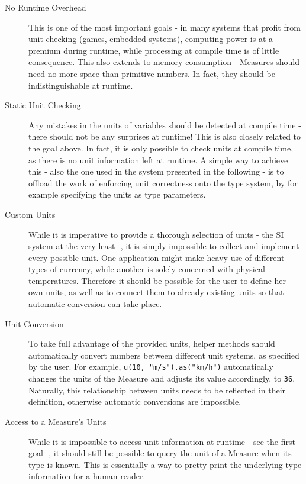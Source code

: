 \documentclass[12pt,oneside,a4paper]{scrbook}
\begin{document}
\begin{description}
  \item[No Runtime Overhead] This is one of the most important goals - in many systems that profit from unit checking (games, embedded systems), computing power is at a premium during runtime, while processing at compile time is of little consequence. This also extends to memory consumption - Measures should need no more space than primitive numbers. In fact, they should be indistinguishable at runtime.

  \item[Static Unit Checking] Any mistakes in the units of variables should be detected at compile time - there should not be any surprises at runtime! This is also closely related to the goal above. In fact, it is only possible to check units at compile time, as there is no unit information left at runtime. A simple way to achieve this - also the one used in the system presented in the following - is to offload the work of enforcing unit correctness onto the type system, by for example specifying the units as type parameters.

  \item[Custom Units] While it is imperative to provide a thorough selection of units - the SI system at the very least -, it is simply impossible to collect and implement every possible unit. One application might make heavy use of different types of currency, while another is solely concerned with physical temperatures. Therefore it should be possible for the user to define her own units, as well as to connect them to already existing units so that automatic conversion can take place.

  \item[Unit Conversion] To take full advantage of the provided units, helper methods should automatically convert numbers between different unit systems, as specified by the user. For example, \verb|u(10, "m/s").as("km/h")| automatically changes the units of the Measure and adjusts its value accordingly, to \verb/36/. Naturally, this relationship between units needs to be reflected in their definition, otherwise automatic conversions are impossible.

  \item[Access to a Measure's Units] While it is impossible to access unit information at runtime - see the first goal -, it should still be possible to query the unit of a Measure when its type is known. This is essentially a way to pretty print the underlying type information for a human reader.


\end{description}
\end{document}
